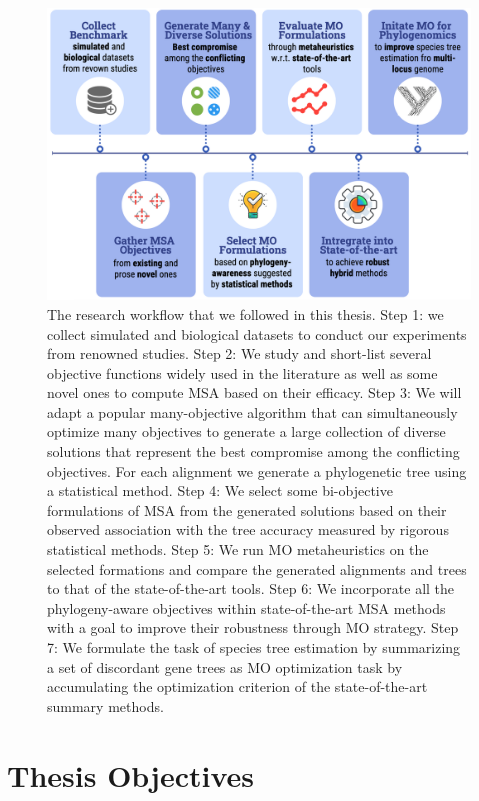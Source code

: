\begin{figure}[!htbp]
	\centering
	\includegraphics[width=1.0\textwidth]{Figure/research-workflow}
	\caption[The research workflow that we followed in this thesis.]{The research workflow that we followed in this thesis. Step 1: we collect simulated and biological datasets to conduct our experiments from renowned studies.
		Step 2: We study and short-list several objective functions widely used in the literature as well as some novel ones to compute MSA based on their efficacy.
		Step 3: We will adapt a popular many-objective algorithm that can simultaneously optimize many objectives to generate a large collection of diverse solutions that represent the best compromise among the conflicting objectives. For each alignment we generate a phylogenetic tree using a statistical method.
		Step 4: We select some bi-objective formulations of MSA from the generated solutions based on their observed association with the tree accuracy measured by rigorous statistical methods.
		Step 5: We run MO metaheuristics on the selected formations and compare the generated alignments and trees to that of the state-of-the-art tools.
		Step 6: We incorporate all the phylogeny-aware objectives within state-of-the-art MSA methods with a goal to improve their robustness through MO strategy.
		Step 7: We formulate the task of species tree estimation by summarizing a set of discordant gene trees as MO optimization task by accumulating the optimization criterion of the state-of-the-art summary methods.
	}
	\label{fig:research-workflow}
	
\end{figure}

\section{Thesis Objectives}

